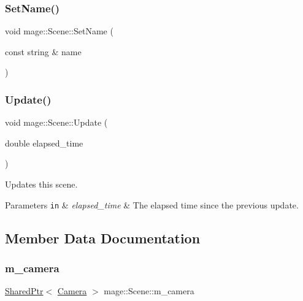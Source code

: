 \hypertarget{classmage_1_1_scene_a9b7c1c2f84cc3b3c5ff3de4f29d830e9}{}\label{classmage_1_1_scene_a9b7c1c2f84cc3b3c5ff3de4f29d830e9} 
\subsubsection{\texorpdfstring{Set\+Name()}{SetName()}}
{\footnotesize\ttfamily void mage\+::\+Scene\+::\+Set\+Name (\begin{DoxyParamCaption}\item[{const string \&}]{name }\end{DoxyParamCaption})}

\hypertarget{classmage_1_1_scene_a8751628bf9ed4f15993ca4e8e2ffc966}{}\label{classmage_1_1_scene_a8751628bf9ed4f15993ca4e8e2ffc966} 
\subsubsection{\texorpdfstring{Update()}{Update()}}
{\footnotesize\ttfamily void mage\+::\+Scene\+::\+Update (\begin{DoxyParamCaption}\item[{double}]{elapsed\+\_\+time }\end{DoxyParamCaption})}

Updates this scene.


\begin{DoxyParams}[1]{Parameters}
\mbox{\tt in}  & {\em elapsed\+\_\+time} & The elapsed time since the previous update. \\
\hline
\end{DoxyParams}


\subsection{Member Data Documentation}
\hypertarget{classmage_1_1_scene_a961c280659f9934441d8e835508e933d}{}\label{classmage_1_1_scene_a961c280659f9934441d8e835508e933d} 
\subsubsection{\texorpdfstring{m\+\_\+camera}{m\_camera}}
{\footnotesize\ttfamily \hyperlink{namespacemage_a1e01ae66713838a7a67d30e44c67703e}{Shared\+Ptr}$<$ \hyperlink{classmage_1_1_camera}{Camera} $>$ mage\+::\+Scene\+::m\+\_\+camera\hspace{0.3cm}{\ttfamily [private]}}

